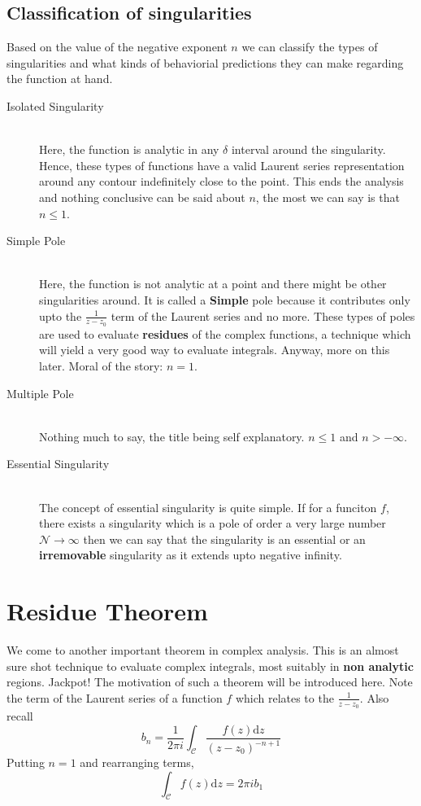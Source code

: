\documentclass[11pt]{article}
\begin{document}
\begin{sloppypar}
\subsection{Classification of singularities}
Based on the value of the negative exponent $n$ we can classify the types of singularities and what kinds of behaviorial predictions they can make regarding the function at hand. 
\begin{description}
\item[Isolated Singularity] \hfill \\
	Here, the function is analytic in any $\delta$ interval around the singularity. Hence, these types of functions have a valid Laurent series representation around any contour indefinitely close to the point. This ends the analysis and nothing conclusive can be said about $n$, the most we can say is that $n \leq 1$.
\item[Simple Pole] \hfill \\
	Here, the function is not analytic at a point and there might be other singularities around. It is called a \textbf{Simple} pole because it contributes only upto the $\frac{1}{z-z_{0}}$ term of the Laurent series and no more. These types of poles are used to evaluate \textbf{residues} of the complex functions, a technique which will yield a very good way to evaluate integrals. Anyway, more on this later. Moral of the story: $n = 1$.
\item[Multiple Pole] \hfill \\
	Nothing much to say, the title being self explanatory. $n \leq 1$ and $n > -\infty$.
\item[Essential Singularity] \hfill \\
	The concept of essential singularity is quite simple. If for a funciton $f$, there exists a singularity which is a pole of order a very large number $\mathcal{N} \to \infty$ then we can say that the singularity is an essential or an \textbf{irremovable} singularity as it extends upto negative infinity. 
\end{description}

\section{Residue Theorem}
We come to another important theorem in complex analysis. This is an almost sure shot technique to evaluate complex integrals, most suitably in \textbf{non analytic} regions. Jackpot! The motivation of such a theorem will be introduced here. Note the term of the Laurent series of a function $f$ which relates to the $\frac{1}{z-z_{0}}$. Also recall
$$b_{n} = \frac{1}{2\pi i}\int_{\mathcal{C}}\frac{f(z)\mathrm{d}z}{(z-z_{0})^{-n+1}}$$
Putting $n=1$ and rearranging terms,
$$\int_{\mathcal{C}}f(z)\mathrm{d}z = 2\pi ib_{1}$$


\end{sloppypar}
\end{document}
